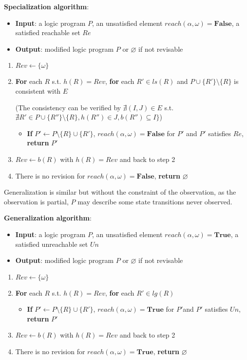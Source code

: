     
    \textbf{Specialization algorithm}:
    \begin{itemize}
        \item \textbf{Input}: a logic program $P$, an unsatisfied element $reach(\alpha,\omega)=\mathbf{False}$, a satisfied reachable set $Re$%
        \item \textbf{Output}: modified logic program $P$ or $\varnothing$ if not revisable
    \end{itemize}
    \begin{enumerate}
        \item $Rev\gets\{\omega\}$
        \item \textbf{For} each $R$ s.t. $h(R)=Rev$, \textbf{for} each $R'\in ls(R)$ and $P\cup\{R'\}\setminus\{R\}$ is consistent with $E$
        
        (The consistency can be verified by $\nexists (I,J)\in E$ s.t. $\nexists R'\in P\cup \{R''\}\setminus \{R\}, h(R'')\in J, b(R'')\subseteq I\}$)
        \begin{itemize}
            \item \textbf{If} $P' \gets P \setminus \{R\} \cup \{R'\}$, $reach(\alpha,\omega)=\mathbf{False}$ for $P'$ and $P'$ satisfies $Re$, \textbf{return} $P'$
        \end{itemize}
        \item $Rev\gets b(R)$ with $h(R)=Rev$ and back to step 2
        \item There is no revision for $reach(\alpha,\omega)=\mathbf{False}$, \textbf{return} $\varnothing$
    \end{enumerate}
    
     Generalization is similar but without the constraint of the observation, as the observation is partial, $P$ may describe some state transitions never observed.
     
    \textbf{Generalization algorithm}:
    \begin{itemize}
        \item \textbf{Input}: a logic program $P$, an unsatisfied element $reach(\alpha,\omega)=\mathbf{True}$, a satisfied unreachable set $Un$
        \item \textbf{Output}: modified logic program $P$ or $\varnothing$ if not revisable
    \end{itemize}
    \begin{enumerate}
        \item $Rev\gets\{\omega\}$
        \item \textbf{For} each $R$ s.t. $h(R)=Rev$, \textbf{for} each $R'\in lg(R)$
        \begin{itemize}
            \item \textbf{If} $P' \gets P \setminus \{R\} \cup \{R'\}$, $reach(\alpha,\omega)=\mathbf{True}$ for $P'$and $P'$ satisfies $Un$, \textbf{return} $P'$
        \end{itemize}
        \item $Rev\gets b(R)$ with $h(R)=Rev$ and back to step 2
        \item There is no revision for $reach(\alpha,\omega)=\mathbf{True}$, \textbf{return} $\varnothing$
    \end{enumerate}
    
